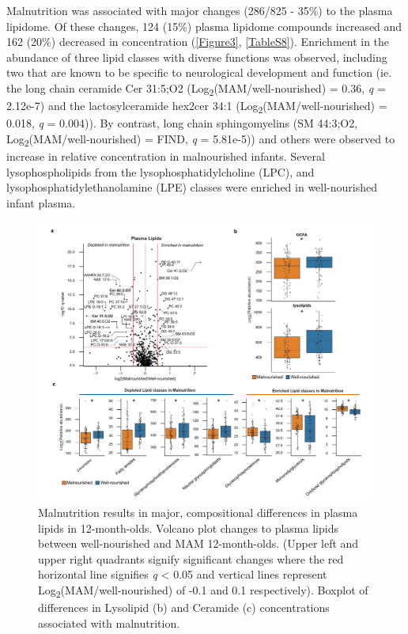 \documentclass{article}
\begin{document}
Malnutrition was associated with major changes (286/825 - 35\%) to the plasma lipidome.
Of these changes, 124 (15\%) plasma lipidome compounds increased and 162 (20\%) decreased in concentration (\autoref{Figure3}, \autoref{TableS8}).
Enrichment in the abundance of three lipid classes with diverse functions was observed, including two that are known to be specific to neurological development and function (ie. the long chain ceramide Cer 31:5;O2 (Log\textsubscript{2}(\gls{MAM}/well-nourished) = 0.36, \textit{q} = 2.12e-7) and the lactosylceramide hex2cer 34:1 (Log\textsubscript{2}(\gls{MAM}/well-nourished) = 0.018, \textit{q} = 0.004)).
By contrast, long chain sphingomyelins (SM 44:3;O2, Log\textsubscript{2}(\gls{MAM}/well-nourished) = FIND, \textit{q} = 5.81e-5)) and others were observed to increase in relative concentration in malnourished infants.
Several lysophospholipids from the lysophosphatidylcholine (LPC), and lysophosphatidylethanolamine (LPE) classes were enriched in well-nourished infant plasma.

\begin{figure}[!htb]
\centering
\includegraphics[scale=0.9]{../../figures/Figure3-lipids.pdf}
\caption[Malnutrition results in major compositional differences in plasma lipids in 12-month-olds]{
	Malnutrition results in major, compositional differences in plasma lipids in 12-month-olds.
	Volcano plot changes to plasma lipids between well-nourished and \gls{MAM} 12-month-olds.
	(Upper left and upper right quadrants signify significant changes where the red horizontal line signifies \textit{q} \textless{} 0.05 and vertical lines represent Log\textsubscript{2}(\gls{MAM}/well-nourished) of -0.1 and 0.1 respectively).
	Boxplot of differences in Lysolipid (b) and Ceramide (c) concentrations associated with malnutrition.}
\label{Figure3}
\end{figure}
\end{document}
